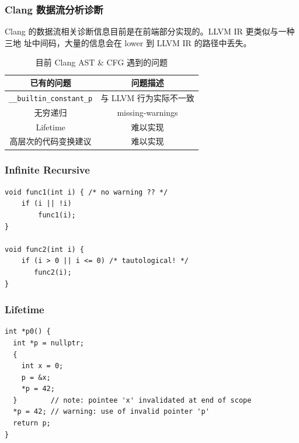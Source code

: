 \begin{frame}
    \frametitle{Clang 数据流分析诊断}

    Clang 的数据流相关诊断信息目前是在前端部分实现的。LLVM IR 更类似与一种三地
    址中间码，大量的信息会在 lower 到 LLVM IR 的路径中丢失。

    \begin{table}
        \centering
        \begin{tabular}{cc}
            \toprule
            已有的问题                             & 问题描述                                             \\
            \midrule
            \texttt{\_\_builtin\_constant\_p} & 与 LLVM 行为实际不一致\cite{aaronballman-constantp-2019} \\
            无穷递归                              & missing-warnings\cite{aaronballman-infrec-2019}  \\
            Lifetime                          & 难以实现                                             \\
            高层次的代码变换建议                        & 难以实现                                             \\
            \bottomrule
        \end{tabular}
        \caption{目前 Clang AST \& CFG 遇到的问题}
    \end{table}
    \label{tab:clang_diag}
\end{frame}

\begin{frame}[fragile]
    \frametitle{Infinite Recursive}
    \begin{center}
        \begin{minipage}{0.7\textwidth}
            \begin{lstlisting}[caption=无限递归诊断\cite{lyc-infrec-2019}]
void func1(int i) { /* no warning ?? */
    if (i || !i)
        func1(i);
}

void func2(int i) {
    if (i > 0 || i <= 0) /* tautological! */
       func2(i);
}
            \end{lstlisting}
        \end{minipage}
    \end{center}
\end{frame}

\begin{frame}[fragile]
    \frametitle{Lifetime}
    \begin{center}
        \begin{minipage}{0.8\textwidth}
            \begin{lstlisting}[caption=生命周期分析与垂悬引用]
int *p0() {
  int *p = nullptr;
  {
    int x = 0;
    p = &x;
    *p = 42;
  }        // note: pointee 'x' invalidated at end of scope
  *p = 42; // warning: use of invalid pointer 'p'
  return p;
}
            \end{lstlisting}

        \end{minipage}
    \end{center}

\end{frame}
